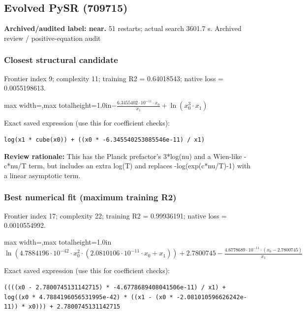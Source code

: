 \documentclass[10pt,letterpaper,landscape]{article}
\begin{document}
\begin{minipage}[t]{0.485\textwidth}
\subsection*{Evolved PySR (709715)}
\textbf{Archived/audited label: near.} 51 restarts; actual search 3601.7 s.
{\small Archived review / positive-equation audit}
\subsubsection*{Closest structural candidate}
Frontier index 9; complexity 11; training R2 = 0.64018543; native loss = 0.0055198613.
\begin{center}\begin{adjustbox}{max width=\linewidth,max totalheight=1.0in}$\displaystyle - \frac{6.3455402 \cdot 10^{-11} \cdot x_{0}}{x_{1}} + \ln{\left(x_{0}^{3} \cdot x_{1} \right)}$\end{adjustbox}\end{center}
{\scriptsize Exact saved expression (use this for coefficient checks):}
\begin{lstlisting}
log(x1 * cube(x0)) + ((x0 * -6.345540253085546e-11) / x1)
\end{lstlisting}
{\small\textbf{Review rationale:} This has the Planck prefactor’s 3*log(nu) and a Wien-like -c*nu/T term, but includes an extra log(T) and replaces -log(exp(c*nu/T)-1) with a linear asymptotic term.}
\subsubsection*{Best numerical fit (maximum training R2)}
Frontier index 17; complexity 22; training R2 = 0.99936191; native loss = 0.0010554992.
\begin{center}\begin{adjustbox}{max width=\linewidth,max totalheight=1.0in}$\displaystyle \ln{\left(4.7884196 \cdot 10^{-42} \cdot x_{0}^{2} \cdot \left(2.0810106 \cdot 10^{-11} \cdot x_{0} + x_{1}\right) \right)} + 2.7800745 - \frac{4.6778689 \cdot 10^{-11} \cdot \left(x_{0} - 2.7800745\right)}{x_{1}}$\end{adjustbox}\end{center}
{\scriptsize Exact saved expression (use this for coefficient checks):}
\begin{lstlisting}
((((x0 - 2.7800745131142715) * -4.6778689408041506e-11) / x1) + log((x0 * 4.7884196056531995e-42) * ((x1 - (x0 * -2.081010596626242e-11)) * x0))) + 2.7800745131142715
\end{lstlisting}
\end{minipage}
\clearpage{}\label{planck-10003}
\end{document}
